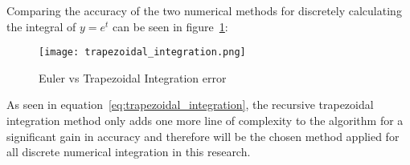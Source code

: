 Comparing the accuracy of the two numerical methods for discretely calculating the integral of $y=e^t$ can be seen in figure~\ref{fig:trapezoidal_integration}:

\begin{figure}[h!]
 \centering
  \texttt{[image: trapezoidal\_integration.png]}
  \caption{Euler vs Trapezoidal Integration error}
  \label{fig:trapezoidal_integration}
\end{figure}

As seen in equation~\ref{eq:trapezoidal_integration}, the recursive trapezoidal integration method only adds one more line of complexity to the algorithm for a significant gain in accuracy and therefore will be the chosen method applied for all discrete numerical integration in this research.













